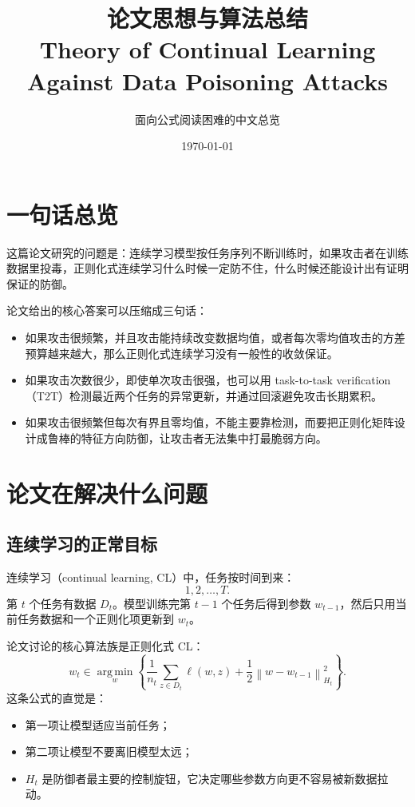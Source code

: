 \documentclass[UTF8,fontset=none,11pt]{ctexart}
\title{\bfseries 论文思想与算法总结\\
{\large Theory of Continual Learning Against Data Poisoning Attacks}}
\author{面向公式阅读困难的中文总览}
\date{\today}
\newcommand{\norm}[1]{\left\lVert #1\right\rVert}
\newcommand{\argmin}{\operatorname*{arg\,min}}
\begin{document}
\maketitle
\tableofcontents
\newpage

\section{一句话总览}

这篇论文研究的问题是：连续学习模型按任务序列不断训练时，如果攻击者在训练数据里投毒，正则化式连续学习什么时候一定防不住，什么时候还能设计出有证明保证的防御。

论文给出的核心答案可以压缩成三句话：
\begin{itemize}
  \item 如果攻击很频繁，并且攻击能持续改变数据均值，或者每次零均值攻击的方差预算越来越大，那么正则化式连续学习没有一般性的收敛保证。
  \item 如果攻击次数很少，即使单次攻击很强，也可以用 task-to-task verification（T2T）检测最近两个任务的异常更新，并通过回滚避免攻击长期累积。
  \item 如果攻击很频繁但每次有界且零均值，不能主要靠检测，而要把正则化矩阵设计成鲁棒的特征方向防御，让攻击者无法集中打最脆弱方向。
\end{itemize}

\section{论文在解决什么问题}

\subsection{连续学习的正常目标}

连续学习（continual learning, CL）中，任务按时间到来：
\[
  1,2,\dots,T .
\]
第 \(t\) 个任务有数据 \(D_t\)。模型训练完第 \(t-1\) 个任务后得到参数 \(w_{t-1}\)，然后只用当前任务数据和一个正则化项更新到 \(w_t\)。

论文讨论的核心算法族是正则化式 CL：
\[
  w_t\in\argmin_w
  \left\{
  \frac1{n_t}\sum_{z\in D_t}\ell(w,z)
  +\frac12\norm{w-w_{t-1}}_{H_t}^2
  \right\}.
\]
这条公式的直觉是：
\begin{itemize}
  \item 第一项让模型适应当前任务；
  \item 第二项让模型不要离旧模型太远；
  \item \(H_t\) 是防御者最主要的控制旋钮，它决定哪些参数方向更不容易被新数据拉动。
\end{itemize}
\end{document}
